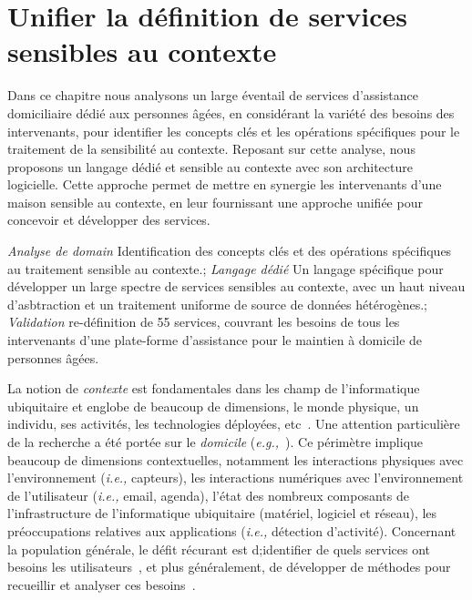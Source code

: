 \chapter{Unifier la définition de services sensibles au contexte}
\begin{preamble}
Dans ce chapitre nous analysons un large éventail de services d'assistance domiciliaire dédié aux personnes âgées, en considérant la variété des besoins des intervenants, pour identifier les concepts clés et les opérations spécifiques pour le traitement de la sensibilité au contexte. Reposant sur cette analyse, nous proposons un langage dédié et sensible au contexte avec son architecture logicielle. Cette approche permet de mettre en synergie les intervenants d'une maison sensible au contexte, en leur fournissant une approche unifiée pour concevoir et développer des services.
\end{preamble}
{
{\em Analyse de domain} Identification des concepts clés et des opérations spécifiques au traitement sensible au contexte.;
{\em Langage dédié} Un langage spécifique pour développer un large spectre de services sensibles au contexte, avec un haut niveau d'asbtraction et un traitement uniforme de source de données hétérogènes.;
{\em Validation} re-définition de 55 services, couvrant les besoins de tous les intervenants d'une plate-forme d'assistance pour le maintien à domicile de personnes âgées.
}


La notion de {\em contexte} est fondamentales dans les champ de l'informatique ubiquitaire et englobe de beaucoup de dimensions, le monde physique, un individu, ses activités, les technologies déployées, etc~\cite{bauer2012comparison}.
Une attention particulière de la recherche a été portée sur le {\em domicile} ({\em e.g.,}~\cite{cook2013casas,feminella2014piloteur}). Ce périmètre implique beaucoup de dimensions contextuelles, notamment les interactions physiques avec l'environnement ({\em i.e.,} capteurs), les interactions numériques avec l'environnement de l'utilisateur ({\em i.e.,} email, agenda), l'état des nombreux composants de l'infrastructure de l'informatique ubiquitaire (matériel, logiciel et réseau), les préoccupations relatives aux applications ({\em i.e.,} détection d'activité). Concernant la population générale, le défit récurant est d;identifier de quels services ont besoins les utilisateurs~\cite{brush2011home}, et plus généralement, de développer de méthodes pour recueillir et analyser ces besoins~\cite{coutaz2010disqo}.

